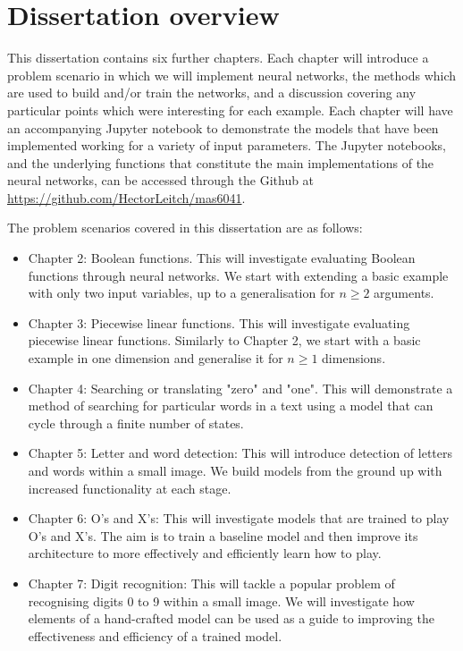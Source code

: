 \documentclass{somasmsc}
\begin{document}
\section{Dissertation overview}

This dissertation contains six further chapters. Each chapter will introduce a problem scenario in which we will implement neural networks, the methods which are used to build and/or train the networks, and a discussion covering any particular points which were interesting for each example. Each chapter will have an accompanying Jupyter notebook to demonstrate the models that have been implemented working for a variety of input parameters. The Jupyter notebooks, and the underlying functions that constitute the main implementations of the neural networks, can be accessed through the Github at \url{https://github.com/HectorLeitch/mas6041}.

The problem scenarios covered in this dissertation are as follows:
\begin{itemize}
    \item Chapter 2: Boolean functions. This will investigate evaluating Boolean functions through neural networks. We start with extending a basic example with only two input variables, up to a generalisation for $n \geq 2$ arguments.
    \item Chapter 3: Piecewise linear functions. This will investigate evaluating piecewise linear functions. Similarly to Chapter 2, we start with a basic example in one dimension and generalise it for $n \geq 1$ dimensions.
    \item Chapter 4: Searching or translating "zero" and "one". This will demonstrate a method of searching for particular words in a text using a model that can cycle through a finite number of states.
    \item Chapter 5: Letter and word detection: This will introduce detection of letters and words within a small image. We build models from the ground up with increased functionality at each stage.
    \item Chapter 6: O's and X's: This will investigate models that are trained to play O's and X's. The aim is to train a baseline model and then improve its architecture to more effectively and efficiently learn how to play.
    \item Chapter 7: Digit recognition: This will tackle a popular problem of recognising digits 0 to 9 within a small image. We will investigate how elements of a hand-crafted model can be used as a guide to improving the effectiveness and efficiency of a trained model.
\end{itemize}
\end{document}

